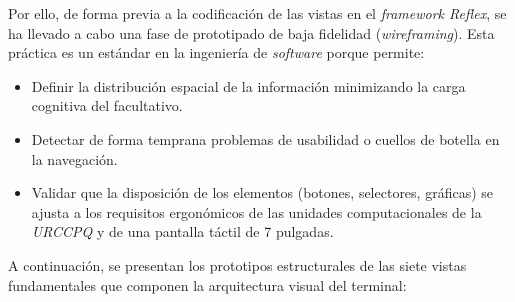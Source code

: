 Por ello, de forma previa a la codificación de las vistas en el \textit{framework Reflex}, se ha llevado a cabo una fase de prototipado de baja fidelidad (\textit{wireframing}). Esta práctica es un estándar en la ingeniería de \textit{software} porque permite:
\begin{itemize}
    \item Definir la distribución espacial de la información minimizando la carga cognitiva del facultativo.
    \item Detectar de forma temprana problemas de usabilidad o cuellos de botella en la navegación.
    \item Validar que la disposición de los elementos (botones, selectores, gráficas) se ajusta a los requisitos ergonómicos de las unidades computacionales de la \textit{URCCPQ} y de una pantalla táctil de 7 pulgadas.
\end{itemize}

A continuación, se presentan los prototipos estructurales de las siete vistas fundamentales que componen la arquitectura visual del terminal:

